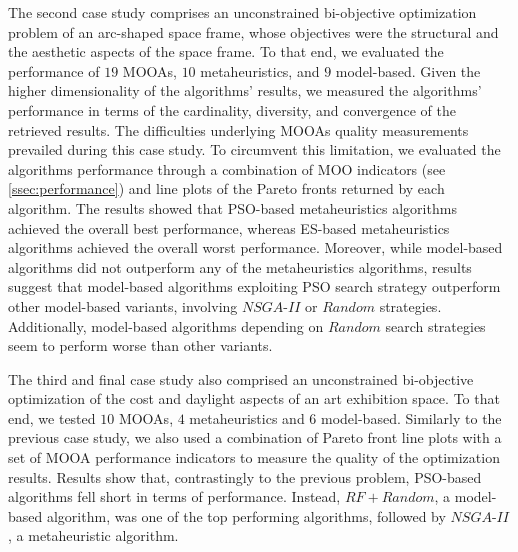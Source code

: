The second case study comprises an unconstrained bi-objective optimization problem of an arc-shaped space frame, whose objectives were the structural and the aesthetic aspects of the space frame. To that end, we evaluated the performance of $19$ \acp{MOOA}, $10$ metaheuristics, and $9$ model-based. Given the higher dimensionality of the algorithms' results, we measured the algorithms' performance in terms of the cardinality, diversity, and convergence of the retrieved results. The difficulties underlying \acp{MOOA} quality measurements prevailed during this case study. To circumvent this limitation, we evaluated the algorithms performance through a combination of \ac{MOO} indicators (see \cref{ssec:performance}) and line plots of the Pareto fronts returned by each algorithm. The results showed that \ac{PSO}-based metaheuristics algorithms achieved the overall best performance, whereas \ac{ES}-based metaheuristics algorithms achieved the overall worst performance. Moreover, while model-based algorithms did not outperform any of the metaheuristics algorithms, results suggest that model-based algorithms exploiting \ac{PSO} search strategy outperform other model-based variants, involving $NSGA$-$II$ or $Random$ strategies. Additionally, model-based algorithms depending on $Random$ search strategies seem to perform worse than other variants. 

The third and final case study also comprised an unconstrained bi-objective optimization of the cost and daylight aspects of an art exhibition space. To that end, we tested $10$ \acp{MOOA}, $4$ metaheuristics and $6$ model-based. Similarly to the previous case study, we also used a combination of Pareto front line plots with a set of \ac{MOOA} performance indicators to measure the quality of the optimization results. Results show that, contrastingly to the previous problem, \ac{PSO}-based algorithms fell short in terms of performance. Instead, $RF+Random$, a model-based algorithm, was one of the top performing algorithms, followed by $NSGA$-$II$, a metaheuristic algorithm. 

